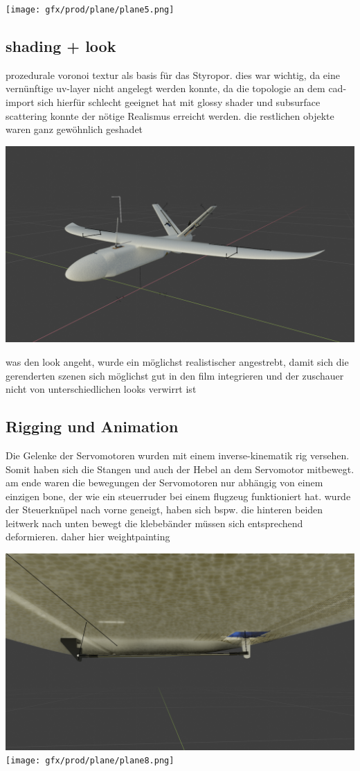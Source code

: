 \texttt{[image: gfx/prod/plane/plane5.png]}
\subsection{shading + look}

prozedurale voronoi textur als basis für das Styropor. 
dies war wichtig, da eine vernünftige uv-layer nicht angelegt werden konnte, da die topologie an dem cad-import sich hierfür schlecht geeignet hat
mit glossy shader und subsurface scattering konnte der nötige Realismus erreicht werden.
die restlichen objekte waren ganz gewöhnlich geshadet

\includegraphics{gfx/prod/plane/plane1.png}

was den look angeht, wurde ein möglichst realistischer angestrebt, damit sich die gerenderten szenen sich möglichst gut in den film integrieren und der zuschauer nicht von unterschiedlichen looks verwirrt ist

\subsection{Rigging und Animation}

Die Gelenke der Servomotoren wurden mit einem inverse-kinematik rig versehen. Somit haben sich die Stangen und auch der Hebel an dem Servomotor mitbewegt.
am ende waren die bewegungen der Servomotoren nur abhängig von einem einzigen bone, der wie ein steuerruder bei einem flugzeug funktioniert hat.
wurde der Steuerknüpel nach vorne geneigt, haben sich bspw. die hinteren beiden  leitwerk nach unten bewegt
die klebebänder müssen sich entsprechend deformieren.
daher hier weightpainting

\includegraphics{gfx/prod/plane/plane4.png}
\texttt{[image: gfx/prod/plane/plane8.png]}

